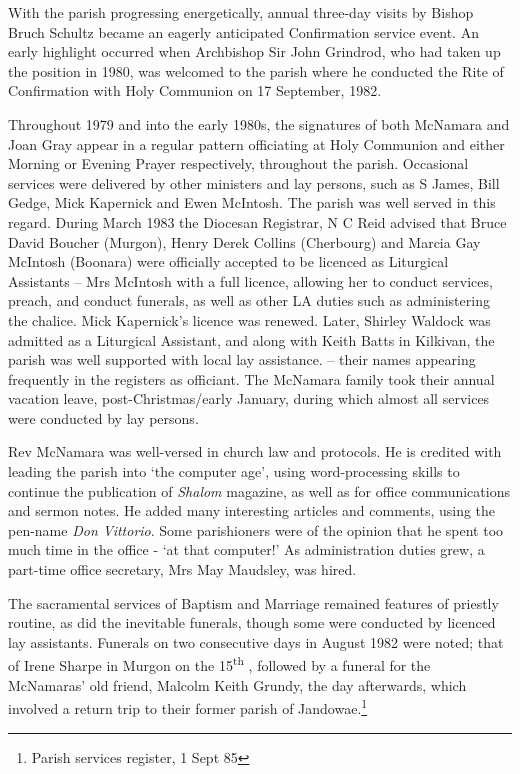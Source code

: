 With the parish progressing energetically, annual three-day visits by Bishop Bruch Schultz became an eagerly anticipated Confirmation service event. An early highlight occurred when Archbishop Sir John Grindrod, who had taken up the position in 1980, was welcomed to the parish where he conducted the Rite of Confirmation with Holy Communion on 17 September, 1982.



Throughout 1979 and into the early 1980s, the signatures of both McNamara and Joan Gray appear in a regular pattern officiating at Holy Communion and either Morning or Evening Prayer respectively, throughout the parish. Occasional services were delivered by other ministers and lay persons, such as S James, Bill Gedge, Mick Kapernick and Ewen McIntosh. The parish was well served in this regard. During March 1983 the Diocesan Registrar, N C Reid advised that Bruce David Boucher (Murgon), Henry Derek Collins (Cherbourg) and Marcia Gay McIntosh (Boonara) were officially accepted to be licenced as Liturgical Assistants -- Mrs McIntosh with a full licence, allowing her to conduct services, preach, and conduct funerals, as well as other LA duties such as administering the chalice. Mick Kapernick's licence was renewed. Later, Shirley Waldock was admitted as a Liturgical Assistant, and along with Keith Batts in Kilkivan, the parish was well supported with local lay assistance. -- their names appearing frequently in the registers as officiant. The McNamara family took their annual vacation leave, post-Christmas/early January, during which almost all services were conducted by lay persons.



Rev McNamara was well-versed in church law and protocols. He is credited with leading the parish into `the computer age', using word-processing skills to continue the publication of \emph{Shalom} magazine, as well as for office communications and sermon notes. He added many interesting articles and comments, using the pen-name \emph{Don Vittorio}. Some parishioners were of the opinion that he spent too much time in the office - `at that computer!' As administration duties grew, a part-time office secretary, Mrs May Maudsley, was hired.



The sacramental services of Baptism and Marriage remained features of priestly routine, as did the inevitable funerals, though some were conducted by licenced lay assistants. Funerals on two consecutive days in August 1982 were noted; that of Irene Sharpe in Murgon on the 15\textsuperscript{th} , followed by a funeral for the McNamaras' old friend, Malcolm Keith Grundy, the day afterwards, which involved a return trip to their former parish of Jandowae.\footnote{Parish services register, 1 Sept 85}


